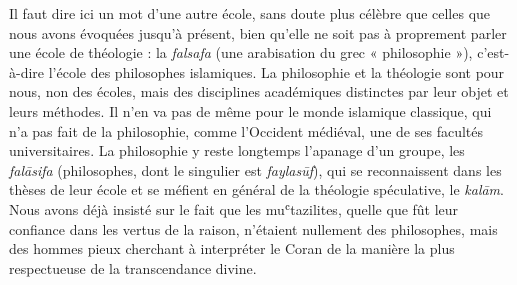 Il faut dire ici un mot d'une autre école, sans doute plus célèbre que
celles que nous avons évoquées jusqu'à présent, bien qu'elle ne soit pas
à proprement parler une école de théologie : la \emph{falsafa} (une
arabisation du grec « philosophie »), c'est-à-dire l'école des
philosophes islamiques.
La philosophie et la théologie sont pour nous, non des écoles, mais des
disciplines académiques distinctes par leur objet et leurs méthodes. Il
n'en va pas de même pour le monde islamique classique, qui n'a pas fait
de la philosophie, comme l'Occident médiéval, une de ses facultés
universitaires. La philosophie y reste longtemps l'apanage d'un groupe,
les \emph{falāsifa} (philosophes, dont le singulier est
\emph{faylasūf}), qui se reconnaissent dans les thèses de leur école et
se méfient en général de la théologie spéculative, le \emph{kalām}. Nous
avons déjà insisté sur le fait que les muʿtazilites, quelle que fût leur
confiance dans les vertus de la raison, n'étaient nullement des
philosophes, mais des hommes pieux cherchant à interpréter le Coran de
la manière la plus respectueuse de la transcendance divine. 

